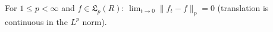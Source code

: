 For $1 \leq p < \infty$ and $f \in \mathfrak{L}_p(R)$: $\lim_{t \to 0} \|f_t - f\|_p = 0$ (translation is continuous in the $L^p$ norm).
